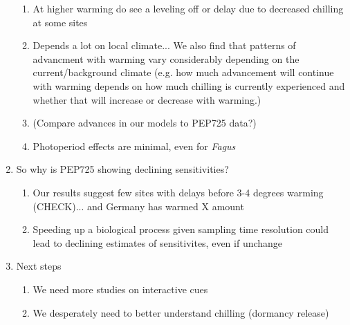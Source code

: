 \documentclass[11pt,letter]{article}
\begin{document}
\begin{enumerate}
\begin{enumerate}
\item At higher warming do see a leveling off or delay due to decreased chilling at some sites
\item Depends a lot on local climate... We also find that patterns of advancment with warming vary considerably depending on the current/background climate (e.g. how much advancement will continue with warming depends on how much chilling is currently experienced and whether that will increase or decrease with warming.)
\item (Compare advances in our models to PEP725 data?)
\item Photoperiod effects are minimal, even for \emph{Fagus}
\end{enumerate}
\item So why is PEP725 showing declining sensitivities?
\begin{enumerate}
\item Our results suggest few sites with delays before 3-4 degrees warming (CHECK)... and Germany has warmed X amount
\item Speeding up a biological process given sampling time resolution could lead to declining estimates of sensitivites, even if unchange
\end{enumerate}
\item Next steps 
\begin{enumerate}
\item We need more studies on interactive cues
\item We desperately need to better understand chilling (dormancy release)
\end{enumerate}
\end{enumerate}
\end{document}
